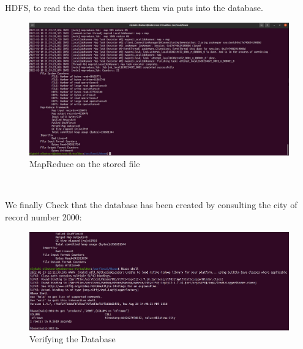 \begin{spacing}{1.2}
HDFS, to read the data then insert them via puts into the database.
\\
\begin{figure}[!htb] 
\begin{center} 
\includegraphics[width=1\linewidth]{Pictures/HBase/Using the HBase Java API/MapReduce on stored file/MapReduce on the stored file} 
\end{center} 
\caption{MapReduce on the stored file} 
\end{figure}  \FloatBarrier
\\
\par We finally Check that the database has been created by consulting the city of record number 2000:
\\
\begin{figure}[!htb] 
\begin{center} 
\includegraphics[width=1\linewidth]{Pictures/HBase/Using the HBase Java API/MapReduce on stored file/Verifying the Database} 
\end{center} 
\caption{Verifying the Database} 
\end{figure}  \FloatBarrier
\\

\end{spacing}